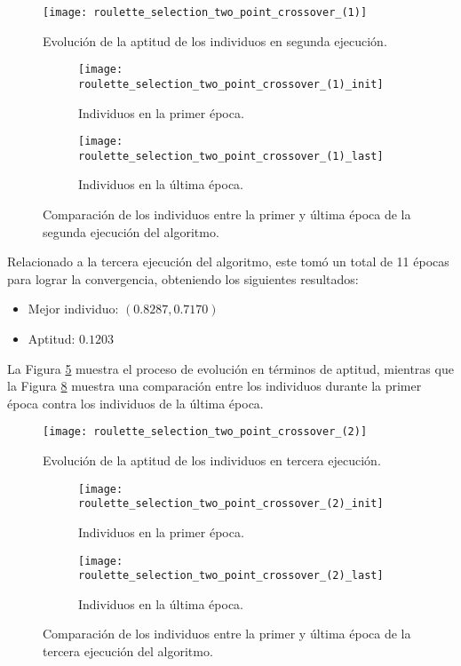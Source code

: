\begin{figure}[htbp]
	\centering
	\texttt{[image: roulette\_selection\_two\_point\_crossover\_(1)]}
	\caption{Evolución de la aptitud de los individuos en segunda ejecución.}
	\label{fig:AG_2}
\end{figure}

\begin{figure}
     \centering
     \begin{subfigure}[b]{0.45\textwidth}
         \centering
         \texttt{[image: roulette\_selection\_two\_point\_crossover\_(1)\_init]}
         \caption{Individuos en la primer época.}
         \label{fig:Ev2_i}
     \end{subfigure}
     \hfill
     \begin{subfigure}[b]{0.45\textwidth}
         \centering
         \texttt{[image: roulette\_selection\_two\_point\_crossover\_(1)\_last]}
         \caption{Individuos en la última época.}
         \label{fig:Ev2_f}
     \end{subfigure}
     \caption{Comparación de los individuos entre la primer y última época de la segunda ejecución del algoritmo.}
     \label{fig:Ev2}
\end{figure}

\FloatBarrier
Relacionado a la tercera ejecución del algoritmo, este tomó un total de 11 épocas para lograr la convergencia, obteniendo los siguientes resultados:
\begin{itemize}
	\item Mejor individuo: $(0.8287, 0.7170)$
	\item Aptitud: $0.1203$
\end{itemize}

La Figura \ref{fig:AG_3} muestra el proceso de evolución en términos de aptitud, mientras que la Figura \ref{fig:Ev3} muestra una comparación entre los individuos durante la primer época contra los individuos de la última época.

\begin{figure}[htbp]
	\centering
	\texttt{[image: roulette\_selection\_two\_point\_crossover\_(2)]}
	\caption{Evolución de la aptitud de los individuos en tercera ejecución.}
	\label{fig:AG_3}
\end{figure}

\begin{figure}
     \centering
     \begin{subfigure}[b]{0.45\textwidth}
         \centering
         \texttt{[image: roulette\_selection\_two\_point\_crossover\_(2)\_init]}
         \caption{Individuos en la primer época.}
         \label{fig:Ev3_i}
     \end{subfigure}
     \hfill
     \begin{subfigure}[b]{0.45\textwidth}
         \centering
         \texttt{[image: roulette\_selection\_two\_point\_crossover\_(2)\_last]}
         \caption{Individuos en la última época.}
         \label{fig:Ev3_f}
     \end{subfigure}
     \caption{Comparación de los individuos entre la primer y última época de la tercera ejecución del algoritmo.}
     \label{fig:Ev3}
\end{figure}
